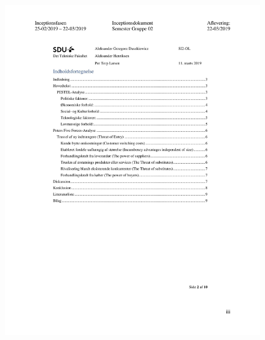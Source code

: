 \begin{figure}[hb]
  \includegraphics[scale = 0.33]{./PNG/Inceptions/Gruppe 02 + InceptionsDokument-36.jpg} 
\end{figure}

